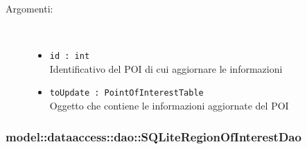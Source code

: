 \documentclass[../DefinizioneDiProdotto.tex]{subfiles}
\begin{document}
\begin{description}
\begin{itemize}
 \begin{description}
\item[Argomenti:] \
\begin{itemize}
\item \texttt{id : int}\\
Identificativo del POI di cui aggiornare le informazioni\item \texttt{toUpdate : PointOfInterestTable}\\
Oggetto che contiene le informazioni aggiornate del POI\end{itemize}
\end{description}
\end{itemize}
\end{description}

\subsubsection{model::dataaccess::dao::SQLiteRegionOfInterestDao}
\end{document}
